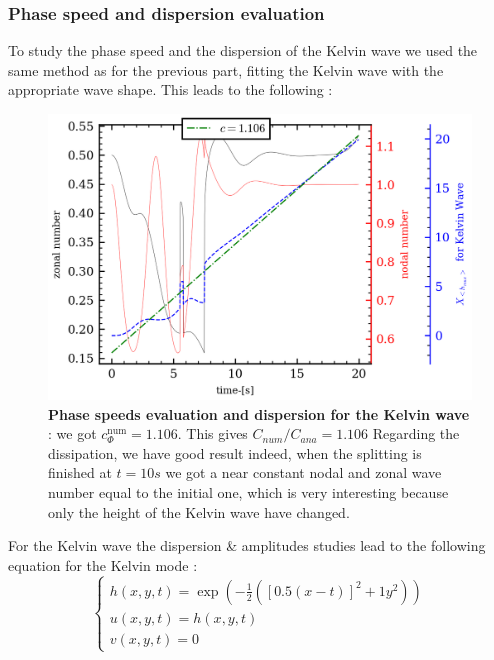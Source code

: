 \documentclass[11pt,a4paper]{report}
\begin{document}
\begin{multicols}{2}
    \subsubsection{Phase speed and dispersion evaluation}
    To study the phase speed and the dispersion of the Kelvin wave we used the same method as for the previous part, fitting the Kelvin wave with the appropriate wave shape. This leads to the following :
    \begin{figure}[H]
        \includegraphics[width=1\linewidth]{./figure/0velocity_wave_params.png}
        \caption{\textbf{Phase speeds evaluation and dispersion for the Kelvin wave} : we got $c_\Phi^{\text{num}} = 1.106$. This gives $C_{num}/C_{ana} = 1.106$ Regarding the dissipation, we have good result indeed, when the splitting is finished at $t = 10s$ we got a near constant nodal and zonal wave number equal to the initial one, which is very interesting because only the height of the Kelvin wave have changed.}
    \end{figure}
    For the Kelvin wave the dispersion \& amplitudes studies lead to the following equation for the Kelvin mode :
    \begin{equation}
        \label{eq:num approx}
        \begin{cases}
            h(x,y,t) = \exp{(-\tfrac{1}{2}([0.5(x -t)]^2 + 1y^2))} \\
            u(x,y,t) = h(x,y,t)                                    \\
            v(x,y,t) = 0
        \end{cases}
    \end{equation}
    \begin{figure}[H]

\end{figure}
\end{multicols}
\end{document}
